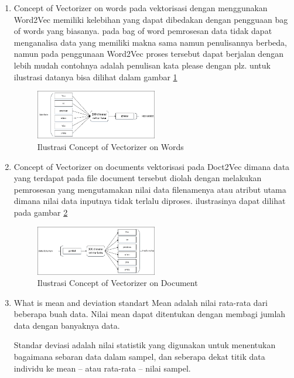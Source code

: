 \begin{enumerate}
\item Concept of Vectorizer on words
\subitem pada vektorisasi dengan menggunakan Word2Vec memiliki kelebihan yang dapat dibedakan dengan pengguaan bag of words yang biasanya.  pada bag of word pemrosesan data tidak dapat menganalisa data yang memiliki makna sama namun penulisannya berbeda, namun pada penggunaan Word2Vec proses tersebut dapat berjalan dengan lebih mudah contohnya adalah penulisan kata please dengan plz. untuk ilustrasi datanya bisa dilihat dalam gambar \ref{fig3}
\begin{figure}[!htbp]
	\centering
	\includegraphics[width=0.5\textwidth]{figures/fathi/chapter5/hari1/3}
	\caption{Ilustrasi Concept of Vectorizer on Words}
	\label{fig3}
\end{figure}

\item Concept of Vectorizer on documents
\subitem vektorisasi pada Doct2Vec dimana data yang terdapat pada file document tersebut diolah dengan melakukan pemrosesan yang mengutamakan nilai data filenamenya atau atribut utama dimana nilai data inputnya tidak terlalu diproses. ilustrasinya dapat dilihat pada gambar \ref{fig4}
\begin{figure}[!htbp]
	\centering
	\includegraphics[width=0.5\textwidth]{figures/fathi/chapter5/hari1/4}
	\caption{Ilustrasi Concept of Vectorizer on Document}
	\label{fig4}
\end{figure}

\item What is mean and deviation standart
\subitem Mean adalah nilai rata-rata dari beberapa buah data. Nilai mean dapat ditentukan dengan membagi jumlah data dengan banyaknya data.

\subitem Standar deviasi adalah nilai statistik yang digunakan untuk menentukan bagaimana sebaran data dalam sampel, dan seberapa dekat titik data individu ke mean – atau rata-rata – nilai sampel.


\end{enumerate}
